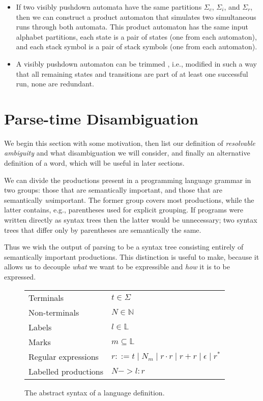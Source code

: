 \documentclass[acmsmall,review,anonymous]{acmart}\settopmatter{printfolios=true,printccs=false,printacmref=false}
\newcommand{\NT}{\mathbb{N}} %
\newcommand{\T}{\Sigma} %
\newcommand{\Labels}{\mathbb{L}} %
\begin{document}
\begin{itemize}
\item If two visibly pushdown automata have the same partitions $\Sigma_c$, $\Sigma_i$, and $\Sigma_r$, then we can construct a product automaton that simulates two simultaneous runs through both automata. This product automaton has the same input alphabet partitions, each state is a pair of states (one from each automaton), and each stack symbol is a pair of stack symbols (one from each automaton).
\item A visibly pushdown automaton can be trimmed \cite{caralpTrimmingVisiblyPushdown2013}, i.e., modified in such a way that all remaining states and transitions are part of at least one successful run, none are redundant.
\end{itemize}

\section{Parse-time Disambiguation}

We begin this section with some motivation, then list our definition of \emph{resolvable ambiguity} and what disambiguation we will consider, and finally an alternative definition of a word, which will be useful in later sections.

We can divide the productions present in a programming language grammar in two groups: those that are semantically important, and those that are semantically \emph{un}important. The former group covers most productions, while the latter contains, e.g., parentheses used for explicit grouping. If programs were written directly as syntax trees then the latter would be unnecessary; two syntax trees that differ only by parentheses are semantically the same.

Thus we wish the output of parsing to be a syntax tree consisting entirely of semantically important productions. This distinction is useful to make, because it allows us to decouple \emph{what} we want to be expressible and \emph{how} it is to be expressed.

\begin{figure}
  \begin{tabular}{@{}ll@{}}
      Terminals & $t \in \T$ \\
      Non-terminals & $N \in \NT$ \\
      Labels & $l \in \Labels$ \\
      Marks & $m \subseteq \Labels$ \\
      Regular expressions & $r ::= t \mid N_m \mid r \cdot r \mid r + r \mid \epsilon \mid r^{*}$ \\
      Labelled productions & $N -> l : r$ \\
  \end{tabular}
  \caption{The abstract syntax of a language definition.}
  \label{fig:input-language-definition}
\end{figure}
\end{document}
